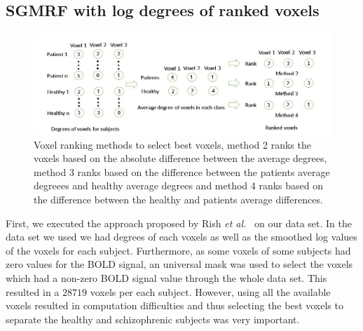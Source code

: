 \documentclass{article} %
\begin{document}
\subsection{SGMRF with log degrees of ranked voxels}
\begin{figure}\label{fig:voxel_rank}
\includegraphics[width=\textwidth]{Voxel_ranking.jpg}
\caption{Voxel ranking methods to select best voxels, method 2 ranks the voxels based on the absolute difference between the average degrees, method 3 ranks based on the difference between the patients average degreees and healthy average degrees and method 4 ranks based on the difference between the healthy and patients average differences.}
\end{figure}
First, we executed the approach proposed by Rish \emph{et al.}~\cite{Rish_2013} on our data set. In the data set we used we had degrees of each voxels as well as the smoothed log values of the voxels for each subject. Furthermore, as some voxels of some subjects had zero values for the BOLD signal, an universal mask was used to select the voxels which had a non-zero BOLD signal value through the whole data set. This resulted in a $28719$ voxels per each subject. However, using all the available voxels resulted in computation difficulties and thus selecting the best voxels to separate the healthy and schizophrenic subjects was very important. 
\end{document}

